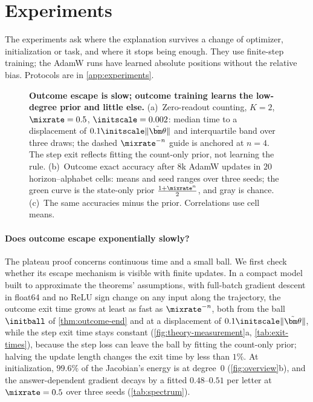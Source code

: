 \section{Experiments}
\label{sec:experiments}
\label{sec:validation}

The experiments ask where the explanation survives a change of optimizer, initialization or task, and where it stops being enough.
They use finite-step training; the AdamW runs have learned absolute positions without the relative bias. Protocols are in \cref{app:experiments}.

\begin{figure}[t]
\centering
\resizebox{\linewidth}{!}{}
\caption{\textbf{Outcome escape is slow; outcome training learns the low-degree prior and little else.}
(a)~Zero-readout counting, $K=2$, $\mixrate=0.5$, $\initscale=0.002$: median time to a displacement of $0.1\initscale\|\tilde{\bm\theta}\|$ and interquartile band over three draws; the dashed $\mixrate^{-n}$ guide is anchored at $n=4$. The step exit reflects fitting the count-only prior, not learning the rule.
(b)~Outcome exact accuracy after $8$k AdamW updates in $20$ horizon--alphabet cells: means and seed ranges over three seeds; the green curve is the state-only prior $\frac{1+\mixrate^n}{2}$, and gray is chance.
(c)~The same accuracies minus the prior. Correlations use cell means.}
\label{fig:theory-measurement}
\label{fig:lambda-grid}
\end{figure}

\paragraph{Does outcome escape exponentially slowly?} The plateau proof concerns continuous time and a small ball. We first check
whether its escape mechanism is visible with finite updates. In a compact model built to approximate the theorems' assumptions, with full-batch gradient descent
in float64 and no ReLU sign change on any input along the trajectory, the outcome exit time grows at least as fast as $\mixrate^{-n}$, both from the
ball $\initball$ of \cref{thm:outcome-end} and at a displacement of $0.1\initscale\|\tilde{\bm\theta}\|$, while the step exit time stays
constant (\cref{fig:theory-measurement}a, \cref{tab:exit-times}), because the step loss can leave the ball by fitting the count-only prior;
halving the update length changes the exit time by less than $1\%$. At
initialization, $99.6\%$ of the Jacobian's energy is at degree~$0$ (\cref{fig:overview}b), and the answer-dependent
gradient decays by a fitted $0.48$--$0.51$ per letter at $\mixrate=0.5$ over three seeds (\cref{tab:spectrum}).


